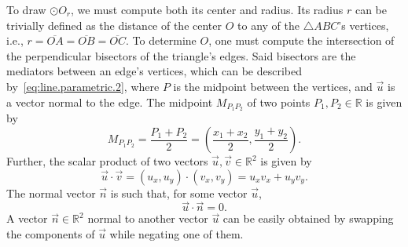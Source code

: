 \begin{comment}
Let $A \in \mathbb{R}^{2 \times 2}$ be the matrix whose columns are the vectors
$\vec{AB} = (a, b)$ and $\vec{AC} = (c, d)$, for instance, such that
%
\begin{equation}\label{eq:matrix.det.2x2}
  \det(A) = \begin{vmatrix}
              a & c\\
              b & d
            \end{vmatrix}%
          = ad - cb
\end{equation}
% 
If the determinant is found to be $0$, then there is no possible solution.
Otherwise, one can proceed to draw $\odot O_r$.
\end{comment}

To draw $\odot O_r$, we must compute both its center and radius.  Its radius $r$
can be trivially defined as the distance of the center $O$ to any of the
$\triangle ABC$'s vertices, i.e., $r = \overline{OA} = \overline{OB} =
\overline{OC}$.  To determine $O$, one must compute the intersection of the
perpendicular bisectors of the triangle's edges.  Said bisectors are the
mediators between an edge's vertices, which can be described
by~\cref{eq:line.parametric.2}, where $P$ is the midpoint between the vertices,
and $\vec{u}$ is a vector normal to the edge.  The midpoint $M_{P_1P_2}$ of two
points $P_1, P_2 \in \mathbb{R}$ is given by
\begin{equation}\label{eq:midpoint.points.2}
  M_{P_1P_2} = \frac{P_1 + P_2}{2}%
             = (\frac{x_1 + x_2}{2}, \frac{y_1 + y_2}{2}).
\end{equation}
Further, the scalar product of two vectors $\vec{u}, \vec{v} \in \mathbb{R}^2$
is given by
\begin{equation}\label{eq:vector.scalar.2}
  \vec{u} \cdot \vec{v} = (u_x, u_y) \cdot (v_x, v_y) = u_x v_x + u_y v_y.
\end{equation}
The normal vector $\vec{n}$ is such that, for some vector $\vec{u}$,
\[
  \vec{u} \cdot \vec{n} = 0.
\]
A vector $\vec{n} \in \mathbb{R}^2$ normal to another vector $\vec{u}$ can be
easily obtained by swapping the components of $\vec{u}$ while negating one of
them.

